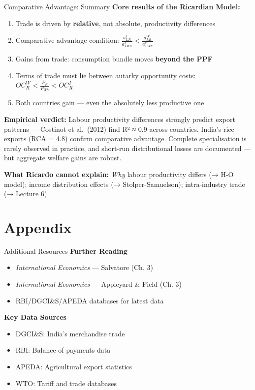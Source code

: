\documentclass[
  ignorenonframetext,
  aspectratio=169,
]{beamer}
\makeatletter
\providecommand{\tightlist}{%
  \setlength{\itemsep}{0pt}\setlength{\parskip}{0pt}}
\let\quarto@originallabel\label
\DeclareRobustCommand*{\label}[1]{\quarto@originallabel{#1}}
\makeatother
\begin{document}
\begin{frame}{Comparative Advantage: Summary}
\label{comparative-advantage-summary}
\textbf{Core results of the Ricardian Model:}

\begin{enumerate}
\tightlist
\item
  Trade is driven by \textbf{relative}, not absolute, productivity
  differences
\item
  Comparative advantage condition:
  \(\frac{a_{LR}^{I}}{a_{LWh}^{I}} < \frac{a_{LR}^{W}}{a_{LWh}^{W}}\)
\item
  Gains from trade: consumption bundle moves \textbf{beyond the PPF}
\item
  Terms of trade must lie between autarky opportunity costs:
  \(OC_R^W < \frac{P_R}{P_{Wh}} < OC_R^I\)
\item
  Both countries gain --- even the absolutely less productive one
\end{enumerate}

\textbf{Empirical verdict:} Labour productivity differences strongly
predict export patterns --- Costinot et al.~(2012) find R² ≈ 0.9 across
countries. India's rice exports (RCA = 4.8) confirm comparative
advantage. Complete specialisation is rarely observed in practice, and
short-run distributional losses are documented --- but aggregate welfare
gains are robust.

\textbf{What Ricardo cannot explain:} \emph{Why} labour productivity
differs (→ H-O model); income distribution effects (→
Stolper-Samuelson); intra-industry trade (→ Lecture 6)
\end{frame}

\section{Appendix}\label{appendix}

\begin{frame}{Additional Resources}
\label{additional-resources}
\textbf{Further Reading}

\begin{itemize}
\tightlist
\item
  \emph{International Economics} --- Salvatore (Ch. 3)
\item
  \emph{International Economics} --- Appleyard \& Field (Ch. 3)
\item
  RBI/DGCI\&S/APEDA databases for latest data
\end{itemize}

\textbf{Key Data Sources}

\begin{itemize}
\tightlist
\item
  DGCI\&S: India's merchandise trade
\item
  RBI: Balance of payments data\\
\item
  APEDA: Agricultural export statistics
\item
  WTO: Tariff and trade databases
\end{itemize}
\end{frame}
\end{document}
